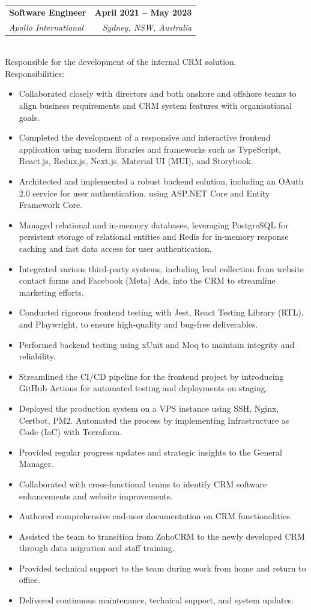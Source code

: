 \documentclass[12pt,a4paper]{article}
\makeatletter
\newcommand{\resumeItem}[1]{
  \item{
    {#1 \vspace{-2pt}}
  }
}
\newcommand{\resumeSubheading}[4]{
  \vspace{-2pt}\item
    \begin{tabular*}{1.0\textwidth}[t]{l@{\extracolsep{\fill}}r}
      \textbf{#1} & \textbf{\small #2} \\
      \textit{\small#3} & \textit{\small #4} \\
    \end{tabular*}\vspace{-7pt}
}
\newcommand{\resumeItemListStart}{\begin{itemize}\itemsep0.2em}
\newcommand{\resumeItemListEnd}{\end{itemize}\vspace{-5pt}}
\makeatother
\begin{document}
    \resumeSubheading
      {Software Engineer}{April 2021 -- May 2023}
      {Apollo International}{Sydney, NSW, Australia}
      \\ \vspace{8pt} Responsible for the development of the internal CRM solution.
      \\ Responsibilities: \vspace{-6pt}
      \resumeItemListStart
        \resumeItem{Collaborated closely with directors and both onshore and offshore teams to align business requirements and CRM system features with organisational goals.}
        \resumeItem{Completed the development of a responsive and interactive frontend application using modern libraries and frameworks such as TypeScript, React.js, Redux.js, Next.js, Material UI (MUI), and Storybook.}
        \resumeItem{Architected and implemented a robust backend solution, including an OAuth 2.0 service for user authentication, using ASP.NET Core and Entity Framework Core.}
        \resumeItem{Managed relational and in-memory databases, leveraging PostgreSQL for persistent storage of relational entities and Redis for in-memory response caching and fast data access for user authentication.}
        \resumeItem{Integrated various third-party systems, including lead collection from website contact forms and Facebook (Meta) Ads, into the CRM to streamline marketing efforts.}
        \resumeItem{Conducted rigorous frontend testing with Jest, React Testing Library (RTL), and Playwright, to ensure high-quality and bug-free deliverables.}
        \resumeItem{Performed backend testing using xUnit and Moq to maintain integrity and reliability.}
        \resumeItem{Streamlined the CI/CD pipeline for the frontend project by introducing GitHub Actions for automated testing and deployments on staging.}
        \resumeItem{Deployed the production system on a VPS instance using SSH, Nginx, Certbot, PM2. Automated the process by implementing Infrastructure as Code (IaC) with Terraform.}
        \resumeItem{Provided regular progress updates and strategic insights to the General Manager.}
        \resumeItem{Collaborated with cross-functional teams to identify CRM software enhancements and website improvements.}
        \resumeItem{Authored comprehensive end-user documentation on CRM functionalities.}
        \resumeItem{Assisted the team to transition from ZohoCRM to the newly developed CRM through data migration and staff training.}
        \resumeItem{Provided technical support to the team during work from home and return to office.}
        \resumeItem{Delivered continuous maintenance, technical support, and system updates.}
      \resumeItemListEnd
\end{document}
